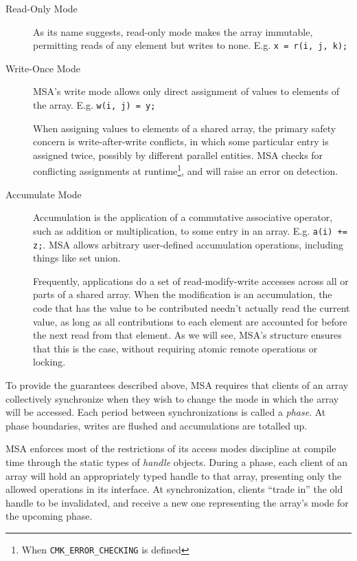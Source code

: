 \begin{description}
\item[Read-Only Mode]
As its name suggests, read-only mode makes the array immutable,
permitting reads of any element but writes to none.
E.g. {\tt x = r(i, j, k);}

\item[Write-Once Mode]
MSA's write mode allows only direct assignment of values to elements
of the array. E.g. {\tt w(i, j) = y;}

When assigning values to elements of a shared array, the primary
safety concern is write-after-write conflicts, in which some
particular entry is assigned twice, possibly by different parallel
entities. MSA checks for conflicting assignments at
runtime\footnote{When {\tt CMK\_ERROR\_CHECKING} is defined}, and will
raise an error on detection.

\item[Accumulate Mode]

Accumulation is the application of a commutative associative operator,
such as addition or multiplication, to some entry in an
array. E.g. {\tt a(i) += z;}. MSA allows arbitrary user-defined
accumulation operations, including things like set union.

Frequently, applications do a set of read-modify-write accesses across
all or parts of a shared array. When the modification is an
accumulation, the code that has the value to be contributed needn't
actually read the current value, as long as all contributions to each
element are accounted for before the next read from that element. As
we will see, MSA's structure ensures that this is the case, without
requiring atomic remote operations or locking.

\end{description}

To provide the guarantees described above, MSA requires that clients
of an array collectively synchronize when they wish to change the mode
in which the array will be accessed. Each period between
synchronizations is called a \emph{phase}. At phase boundaries, writes
are flushed and accumulations are totalled up.

MSA enforces most of the restrictions of its access modes discipline
at compile time through the static types of \emph{handle}
objects. During a phase, each client of an array will hold an
appropriately typed handle to that array, presenting only the allowed
operations in its interface. At synchronization, clients ``trade in''
the old handle to be invalidated, and receive a new one representing
the array's mode for the upcoming phase.

